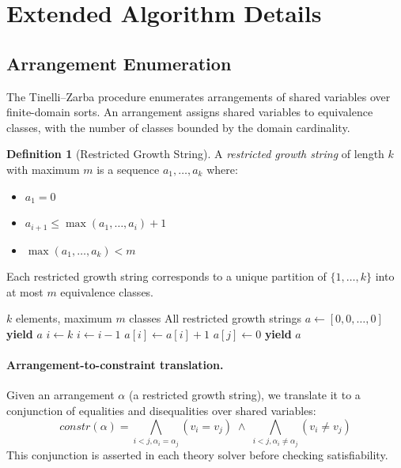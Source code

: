 \documentclass[10pt]{article}
\theoremstyle{plain}
\theoremstyle{definition}
\newtheorem{definition}[theorem]{Definition}
\theoremstyle{remark}
\begin{document}
\section{Extended Algorithm Details}\label{sec:algorithms}

\subsection{Arrangement Enumeration}

The Tinelli--Zarba procedure enumerates arrangements of shared
variables over finite-domain sorts.  An arrangement assigns shared
variables to equivalence classes, with the number of classes bounded
by the domain cardinality.

\begin{definition}[Restricted Growth String]
A \emph{restricted growth string} of length $k$ with maximum $m$
is a sequence $a_1, \ldots, a_k$ where:
\begin{itemize}[nosep]
  \item $a_1 = 0$
  \item $a_{i+1} \leq \max(a_1, \ldots, a_i) + 1$
  \item $\max(a_1, \ldots, a_k) < m$
\end{itemize}
Each restricted growth string corresponds to a unique partition of
$\{1, \ldots, k\}$ into at most $m$ equivalence classes.
\end{definition}

\begin{algorithm}[t]
\caption{Restricted growth string enumeration}
\label{alg:rgs}
\begin{algorithmic}[1]
\Require $k$ elements, maximum $m$ classes
\Ensure All restricted growth strings
\State $a \gets [0, 0, \ldots, 0]$ 
\State \textbf{yield} $a$
\Loop
  \State $i \gets k$ 
    \State $i \gets i - 1$
  \EndWhile
   \Return {}
  \EndIf
  \State $a[i] \gets a[i] + 1$
    \State $a[j] \gets 0$
  \EndFor
  \State \textbf{yield} $a$
\EndLoop
\end{algorithmic}
\end{algorithm}

\paragraph{Arrangement-to-constraint translation.}
Given an arrangement $\alpha$ (a restricted growth string), we
translate it to a conjunction of equalities and disequalities over
shared variables:
\[
  \mathit{constr}(\alpha) = \bigwedge_{i < j, \alpha_i = \alpha_j}
    (v_i = v_j) \;\land\;
  \bigwedge_{i < j, \alpha_i \neq \alpha_j}
    (v_i \neq v_j)
\]
This conjunction is asserted in each theory solver before checking
satisfiability.
\end{document}
